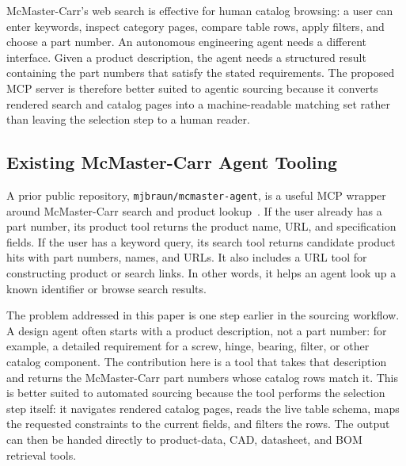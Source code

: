 \documentclass[colorlinks,upint,subscriptcorrection,varvw,hyphenate,balance,nofoot]{asmeconf}
\newcommand{\tool}[1]{\texttt{#1}}
\begin{document}
McMaster-Carr's web search is effective for human catalog browsing: a user can enter keywords, inspect category pages, compare table rows, apply filters, and choose a part number. An autonomous engineering agent needs a different interface. Given a product description, the agent needs a structured result containing the part numbers that satisfy the stated requirements. The proposed MCP server is therefore better suited to agentic sourcing because it converts rendered search and catalog pages into a machine-readable matching set rather than leaving the selection step to a human reader.

\subsection{Existing McMaster-Carr Agent Tooling}

A prior public repository, \tool{mjbraun/mcmaster-agent}, is a useful MCP wrapper around McMaster-Carr search and product lookup~\cite{mcmasteragent}. If the user already has a part number, its product tool returns the product name, URL, and specification fields. If the user has a keyword query, its search tool returns candidate product hits with part numbers, names, and URLs. It also includes a URL tool for constructing product or search links. In other words, it helps an agent look up a known identifier or browse search results.

The problem addressed in this paper is one step earlier in the sourcing workflow. A design agent often starts with a product description, not a part number: for example, a detailed requirement for a screw, hinge, bearing, filter, or other catalog component. The contribution here is a tool that takes that description and returns the McMaster-Carr part numbers whose catalog rows match it. This is better suited to automated sourcing because the tool performs the selection step itself: it navigates rendered catalog pages, reads the live table schema, maps the requested constraints to the current fields, and filters the rows. The output can then be handed directly to product-data, CAD, datasheet, and BOM retrieval tools.
\end{document}
